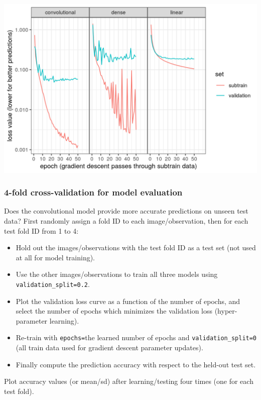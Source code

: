 \documentclass{beamer}
\begin{document}
\begin{frame}
  \includegraphics[width=\textwidth]{figure-validation-loss-three}
\end{frame}

\begin{frame}
  \frametitle{4-fold cross-validation for model evaluation}
  Does the convolutional model provide more accurate predictions on
  unseen test data? First randomly assign a fold ID to each image/observation,
  then for each test fold ID from 1 to 4:
  \begin{itemize}
  \item Hold out the images/observations with the test fold ID as a
    test set (not used at all for model training).
  \item Use the other images/observations to train all three models
    using \texttt{validation\_split=0.2}.
  \item Plot the validation loss curve as a function of the number of
    epochs, and select the number of epochs which minimizes the
    validation loss (hyper-parameter learning).
  \item Re-train with \texttt{epochs=}the learned number of epochs and
    \texttt{validation\_split=0} (all train data used for gradient
    descent parameter updates).
  \item Finally compute the prediction accuracy with respect to the
    held-out test set.
  \end{itemize}
  Plot accuracy values (or mean/sd) after learning/testing four times
  (one for each test fold).
\end{frame}
 
\end{document}
